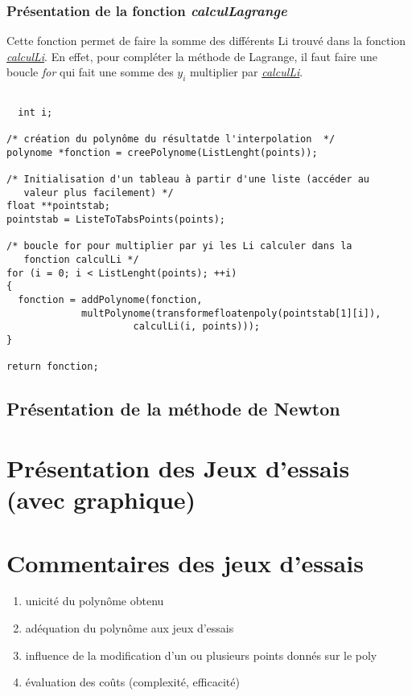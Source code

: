\documentclass[letter]{article}
\begin{document}
\subsubsection{Présentation de la fonction \emph{calculLagrange}}
\label{sec:org6882511}

Cette fonction permet de faire la somme des différents Li trouvé dans la fonction \hyperref[sec:orgc3c91b2]{\emph{calculLi}}.
En effet, pour compléter la méthode de Lagrange, il faut faire une boucle \emph{for} qui fait une somme des \(y_i\) multiplier par \hyperref[sec:orgc3c91b2]{\emph{calculLi}}.

\begin{verbatim}

  int i;

/* création du polynôme du résultatde l'interpolation  */
polynome *fonction = creePolynome(ListLenght(points));

/* Initialisation d'un tableau à partir d'une liste (accéder au
   valeur plus facilement) */
float **pointstab;
pointstab = ListeToTabsPoints(points);

/* boucle for pour multiplier par yi les Li calculer dans la
   fonction calculLi */
for (i = 0; i < ListLenght(points); ++i)
{
  fonction = addPolynome(fonction,
			 multPolynome(transformefloatenpoly(pointstab[1][i]),
				      calculLi(i, points)));
}

return fonction;

\end{verbatim}

\subsection{Présentation de la méthode de Newton}
\label{sec:orga351f60}


\section{Présentation des Jeux d'essais (avec graphique)}
\label{sec:org9724f6c}

\section{Commentaires des jeux d'essais}
\label{sec:org56431b8}

\begin{enumerate}
\item unicité du polynôme obtenu
\item adéquation du polynôme aux jeux d'essais
\item influence de la modification d'un ou plusieurs points donnés sur le poly
\item évaluation des coûts (complexité, efficacité)
\end{enumerate}
\end{document}
